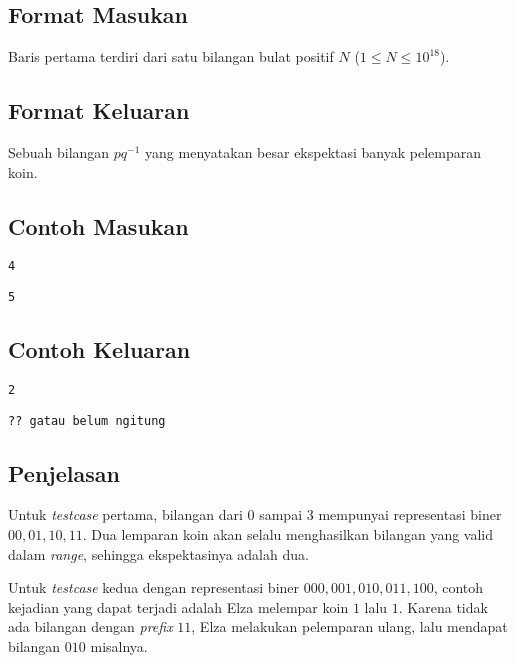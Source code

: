 \documentclass{article}
\begin{document}
\subsection*{Format Masukan}
Baris pertama terdiri dari satu bilangan bulat positif $N$ ($1 \leq N \leq 10^{18}$).

\subsection*{Format Keluaran}
Sebuah bilangan $pq^{-1}$ yang menyatakan besar ekspektasi banyak pelemparan koin.

\begin{multicols}{2}
\subsection*{Contoh Masukan}
\begin{lstlisting}
4
\end{lstlisting}
\begin{lstlisting}
5
\end{lstlisting}
\columnbreak
\subsection*{Contoh Keluaran}
\begin{lstlisting}
2
\end{lstlisting}
\begin{lstlisting}
?? gatau belum ngitung
\end{lstlisting}
\end{multicols}

\subsection*{Penjelasan}
Untuk \textit{testcase} pertama, bilangan dari $0$ sampai $3$ mempunyai representasi biner $00, 01, 10, 11$. Dua lemparan koin akan selalu menghasilkan bilangan yang valid dalam \textit{range}, sehingga ekspektasinya adalah dua.

Untuk \textit{testcase} kedua dengan representasi biner $000, 001, 010, 011, 100$, contoh kejadian yang dapat terjadi adalah Elza melempar koin $1$ lalu $1$. Karena tidak ada bilangan dengan \textit{prefix} $11$, Elza melakukan pelemparan ulang, lalu mendapat bilangan $010$ misalnya. 
\pagebreak
\end{document}
